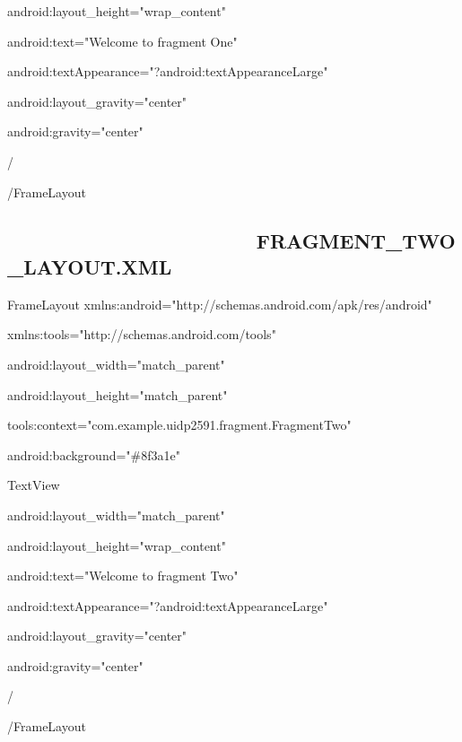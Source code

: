 \documentclass{article}
\begin{document}
android:layout\_height="wrap\_content"

android:text="Welcome to fragment One"

android:textAppearance="?android:textAppearanceLarge"

android:layout\_gravity="center"

android:gravity="center"

/\TEXTsymbol{>}

\TEXTsymbol{<}/FrameLayout\TEXTsymbol{>}

\bigskip 

\subsection{\protect\bigskip\ \ \ \ \ \ \ \ \ \ \ \ \ \ \ \ \ \ \ \ \ \ \
FRAGMENT\_TWO\_LAYOUT.XML}


\bigskip 

\TEXTsymbol{<}FrameLayout
xmlns:android="http://schemas.android.com/apk/res/android"

xmlns:tools="http://schemas.android.com/tools"

android:layout\_width="match\_parent"

android:layout\_height="match\_parent"

tools:context="com.example.uidp2591.fragment.FragmentTwo"

android:background="\#8f3a1e"\TEXTsymbol{>}

\TEXTsymbol{<}TextView

android:layout\_width="match\_parent"

android:layout\_height="wrap\_content"

android:text="Welcome to fragment Two"

android:textAppearance="?android:textAppearanceLarge"

android:layout\_gravity="center"

android:gravity="center"

/\TEXTsymbol{>}

\TEXTsymbol{<}/FrameLayout\TEXTsymbol{>}

\bigskip 
\end{document}
